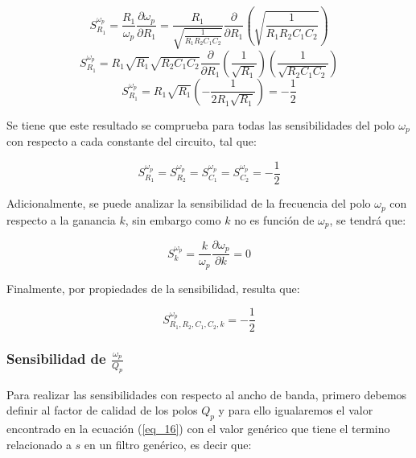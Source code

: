 \documentclass[12pt,a4paper]{article}
\begin{document}
\begin{equation}
    \label{eq_50}
    S_{R_{1}}^{\omega_{p}} = \frac{R_{1}}{\omega_{p}}\frac{\partial \omega_{p}}{\partial R_{1}} 
    = \frac{R_{1}}{\sqrt{\frac{1}{R_{1}R_{2}C_{1}C_{2}}}} \frac{\partial}{\partial R_{1}}\left(\sqrt{\frac{1}{R_{1}R_{2}C_{1}C_{2}}}\right) 
\end{equation}
\begin{equation}
    \label{eq_51}
    S_{R_{1}}^{\omega_{p}} = R_{1} \sqrt{R_{1}}\sqrt{R_{2}C_{1}C_{2}} \frac{\partial}{\partial R_{1}} \left(\frac{1}{\sqrt{R_{1}}} \right) \left(\frac{1}{\sqrt{R_{2}C_{1}C_{2}}}\right)
\end{equation}
\begin{equation}
    \label{eq_52}
    S_{R_{1}}^{\omega_{p}} = R_{1} \sqrt{R_{1}} \left(-\frac{1}{2R_{1}\sqrt{R_{1}}}\right) = - \frac{1}{2}
\end{equation}

Se tiene que este resultado se comprueba para todas las sensibilidades del polo $\omega_{p}$ con respecto a cada constante del circuito, tal que:

\begin{equation}
    \label{eq_53}
    S_{R_{1}}^{\omega_{p}} = S_{R_{2}}^{\omega_{p}} = S_{C_{1}}^{\omega_{p}} = S_{C_{2}}^{\omega_{p}} = - \frac{1}{2}
\end{equation}

Adicionalmente, se puede analizar la sensibilidad de la frecuencia del polo $\omega_{p}$ con respecto a la ganancia $k$, sin embargo como $k$ no es función de $\omega_{p}$, se tendrá que:

\begin{equation}
    \label{eq_54}
    S_{k}^{\omega_{p}} = \frac{k}{\omega_{p}}\frac{\partial \omega_{p}}{\partial k} = 0
\end{equation}

Finalmente, por propiedades de la sensibilidad, resulta que:

\begin{equation}
    \label{eq_55}
    S_{R_{1}, R_{2}, C_{1}, C_{2}, k}^{\omega_{p}} = - \frac{1}{2}
\end{equation}


\subsubsection{Sensibilidad de $\frac{\omega_{p}}{Q_{p}}$}
Para realizar las sensibilidades con respecto al ancho de banda, primero debemos definir al factor de calidad de los polos $Q_{p}$ y para ello igualaremos el valor encontrado en la ecuación (\ref{eq_16}) con el valor genérico que tiene el termino relacionado a $s$ en un filtro genérico, es decir que:
\end{document}
